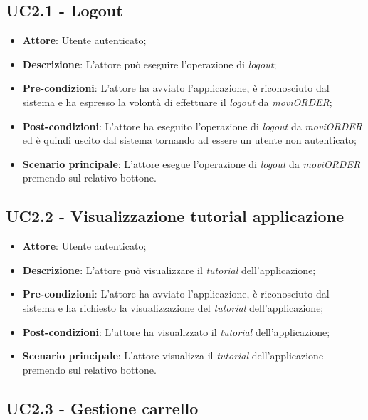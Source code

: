 \subsection{UC2.1 - Logout}

\begin{itemize}
	\item \textbf{Attore}: Utente autenticato;
	\item \textbf{Descrizione}: L'attore può eseguire l'operazione di \textit{logout};
	\item \textbf{Pre-condizioni}: L'attore ha avviato l'applicazione, è riconosciuto dal sistema e ha espresso la volontà di effettuare il \textit{logout} da \textit{moviORDER};
	\item \textbf{Post-condizioni}: L'attore ha eseguito l'operazione di \textit{logout} da \textit{moviORDER} ed è quindi uscito dal sistema tornando ad essere un utente non autenticato;
	\item \textbf{Scenario principale}: L'attore esegue l'operazione di \textit{logout} da \textit{moviORDER} premendo sul relativo bottone.
\end{itemize}

\subsection{UC2.2 - Visualizzazione tutorial applicazione}

\begin{itemize}
	\item \textbf{Attore}: Utente autenticato;
	\item \textbf{Descrizione}: L'attore può visualizzare il \textit{tutorial} dell'applicazione;
	\item \textbf{Pre-condizioni}: L'attore ha avviato l'applicazione, è riconosciuto dal sistema e ha richiesto la visualizzazione del \textit{tutorial} dell'applicazione;
	\item \textbf{Post-condizioni}: L'attore ha visualizzato il \textit{tutorial} dell'applicazione;
	\item \textbf{Scenario principale}: L'attore visualizza il \textit{tutorial} dell'applicazione premendo sul relativo bottone.
\end{itemize}

\newpage

\subsection{UC2.3 - Gestione carrello}

